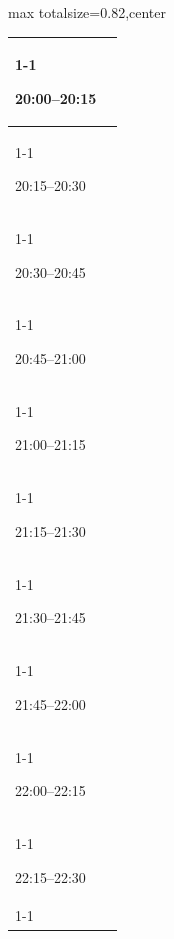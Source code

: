 \documentclass[11pt,a4paper]{article}
\begin{document}
\begin{center}
\begin{adjustbox}{max totalsize={\textwidth}{0.82\textheight},center}
\begin{tabular}{|p{3.6cm}|p{11cm}|}
\cline{1-1}
{\centering\rule{0pt}{2.80ex}20:00--20:15} & {\centering\rule{0pt}{2.80ex}} \\
\cline{1-1}
{\centering\rule{0pt}{2.80ex}20:15--20:30} & {\centering\rule{0pt}{2.80ex}} \\
\cline{1-1}
{\centering\rule{0pt}{2.80ex}20:30--20:45} & {\centering\rule{0pt}{2.80ex}} \\
\cline{1-1}
{\centering\rule{0pt}{2.80ex}20:45--21:00} & {\centering\rule{0pt}{2.80ex}} \\
\cline{1-1}
{\centering\rule{0pt}{2.80ex}21:00--21:15} & {\centering\rule{0pt}{2.80ex}} \\
\cline{1-1}
{\centering\rule{0pt}{2.80ex}21:15--21:30} & {\centering\rule{0pt}{2.80ex}} \\
\cline{1-1}
{\centering\rule{0pt}{2.80ex}21:30--21:45} & {\centering\rule{0pt}{2.80ex}} \\
\cline{1-1}
{\centering\rule{0pt}{2.80ex}21:45--22:00} & {\centering\rule{0pt}{2.80ex}} \\
\cline{1-1}
{\centering\rule{0pt}{2.80ex}22:00--22:15} & {\centering\rule{0pt}{2.80ex}} \\
\cline{1-1}
{\centering\rule{0pt}{2.80ex}22:15--22:30} & {\centering\rule{0pt}{2.80ex}} \\
\cline{1-1}
\hline
\end{tabular}
\end{adjustbox}
\end{center}

\clearpage
\end{document}
